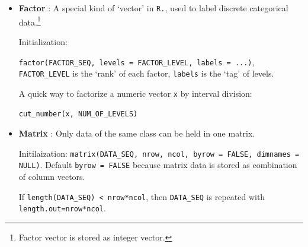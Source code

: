 \begin{itemize}[topsep=2pt,itemsep=0pt]
         

    \item \textbf{Factor} : A special kind of `vector' in \lstinline|R.|, used to label discrete categorical data.\footnote{Factor vector is stored as integer vector.}
    
    Initialization:

    \lstinline|factor(FACTOR_SEQ, levels = FACTOR_LEVEL, labels = ...)|, \lstinline|FACTOR_LEVEL| is the `rank' of each factor, \lstinline|labels| is the `tag' of levels. 

    A quick way to factorize a numeric vector \lstinline|x| by interval division:
    
    \lstinline|cut_number(x, NUM_OF_LEVELS)|

    \item \textbf{Matrix} : Only data of the same class can be held in one matrix.
    
    Initilaization: \lstinline|matrix(DATA_SEQ, nrow, ncol, byrow = FALSE, dimnames = NULL)|. Default \lstinline|byrow = FALSE| because matrix data is stored as combination of column vectors.
    
    If \lstinline|length(DATA_SEQ) < nrow*ncol|, then \lstinline|DATA_SEQ| is repeated with \lstinline|length.out=nrow*ncol|. 


\end{itemize}
